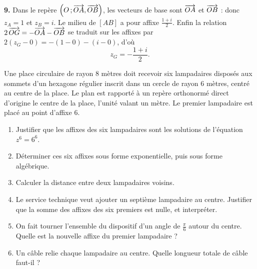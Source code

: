 \begin{corrige}[annales]
\textbf{9.} Dans le repère $\left(O\,;\overrightarrow{OA},\overrightarrow{OB}\right)$, les
vecteurs de base sont $\overrightarrow{OA}$ et $\overrightarrow{OB}$ : donc $z_{A} = 1$ et
$z_{B} = i$. Le milieu de $[AB]$ a pour affixe $\frac{1+i}{2}$. Enfin la
relation $2\,\overrightarrow{OG} = -\overrightarrow{OA}-\overrightarrow{OB}$ se traduit sur les affixes par
$2\left(z_{G}-0\right) = -(1-0)-(i-0)$, d'où
\[
  z_{G} = -\frac{1+i}{2}.
\]
\end{corrige}

\begin{jecherche}
Une place circulaire de rayon $8$ mètres doit recevoir six lampadaires
disposés aux sommets d'un hexagone régulier inscrit dans un cercle de rayon
$6$ mètres, centré au centre de la place. Le plan est rapporté à un repère
orthonormé direct d'origine le centre de la place, l'unité valant un mètre.
Le premier lampadaire est placé au point d'affixe $6$.

\begin{enumerate}[label=\textbf{\arabic*.}, leftmargin=*, itemsep=0.3em]
  \item Justifier que les affixes des six lampadaires sont les solutions de
        l'équation $z^{6} = 6^{6}$.
  \item Déterminer ces six affixes sous forme exponentielle, puis sous forme
        algébrique.
  \item Calculer la distance entre deux lampadaires voisins.
  \item Le service technique veut ajouter un septième lampadaire au centre.
        Justifier que la somme des affixes des six premiers est nulle, et
        interpréter.
  \item On fait tourner l'ensemble du dispositif d'un angle de
        $\frac{\pi}{6}$ autour du centre. Quelle est la nouvelle affixe du
        premier lampadaire ?
  \item Un câble relie chaque lampadaire au centre. Quelle longueur totale de
        câble faut-il ?
\end{enumerate}
\end{jecherche}

